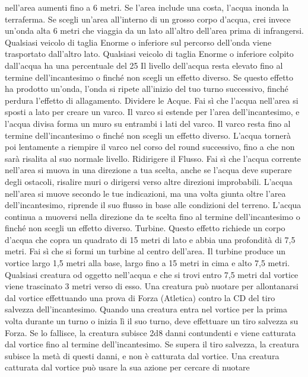 \begin{multicols}{2}
nell’area aumenti fino a 6 metri. Se l’area include una
costa, l’acqua inonda la terraferma.
Se scegli un’area all’interno di un grosso corpo d’acqua,
crei invece un’onda alta 6 metri che viaggia da un lato
all’altro dell’area prima di infrangersi. Qualsiasi veicolo
di taglia Enorme o inferiore sul percorso dell’onda viene
trasportato dall’altro lato. Qualsiasi veicolo di taglia
Enorme o inferiore colpito dall’acqua ha una
percentuale del 25%
Il livello dell’acqua resta elevato fino al termine
dell’incantesimo o finché non scegli un effetto diverso.
Se questo effetto ha prodotto un’onda, l’onda si ripete
all’inizio del tuo turno successivo, finché perdura
l’effetto di allagamento.
Dividere le Acque. Fai sì che l’acqua nell’area si sposti
a lato per creare un varco. Il varco si estende per l’area
dell’incantesimo, e l’acqua divisa forma un muro su
entrambi i lati del varco. Il varco resta fino al termine
dell’incantesimo o finché non scegli un effetto diverso.
L’acqua tornerà poi lentamente a riempire il varco nel
corso del round successivo, fino a che non sarà risalita
al suo normale livello.
Ridirigere il Flusso. Fai sì che l’acqua corrente
nell’area si muova in una direzione a tua scelta, anche
se l’acqua deve superare degli ostacoli, risalire muri o
dirigersi verso altre direzioni improbabili. L’acqua
nell’area si muove secondo le tue indicazioni, ma una
volta giunta oltre l’area dell’incantesimo, riprende il suo 
flusso in base alle condizioni del terreno. L’acqua
continua a muoversi nella direzione da te scelta fino al
termine dell’incantesimo o finché non scegli un effetto
diverso.
Turbine. Questo effetto richiede un corpo d’acqua che
copra un quadrato di 15 metri di lato e abbia una
profondità di 7,5 metri. Fai sì che si formi un turbine al
centro dell’area. Il turbine produce un vortice largo 1,5
metri alla base, largo fino a 15 metri in cima e alto 7,5
metri. Qualsiasi creatura od oggetto nell’acqua e che si
trovi entro 7,5 metri dal vortice viene trascinato 3 metri
verso di esso. Una creatura può nuotare per
allontanarsi dal vortice effettuando una prova di Forza
(Atletica) contro la CD del tiro salvezza
dell’incantesimo.
Quando una creatura entra nel vortice per la prima volta
durante un turno o inizia lì il suo turno, deve effettuare
un tiro salvezza su Forza. Se lo fallisce, la creatura
subisce 2d8 danni contundenti e viene catturata dal
vortice fino al termine dell’incantesimo. Se supera il tiro
salvezza, la creatura subisce la metà di questi danni, e
non è catturata dal vortice. Una creatura catturata dal
vortice può usare la sua azione per cercare di nuotare

\end{multicols}

